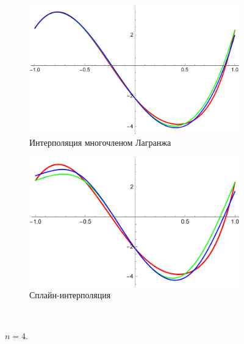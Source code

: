 \documentclass[12pt, a4paper]{article}
\begin{document}
	
	\begin{figure}[H]
		\centering
		\begin{subfigure}{0.4\textwidth}
			\includegraphics[width=\textwidth]{4_l4}
			\caption{Интерполяция многочленом Лагранжа}
		\end{subfigure}
		\hfill
		\begin{subfigure}{0.4\textwidth}
			\includegraphics[width=\textwidth]{4_s4}
			\caption{Сплайн-интерполяция}
		\end{subfigure}
		\hfill
		\\[0.5cm]
		\caption{$n = 4$.}
	\end{figure}
	
	\hfill
	
\end{document}
